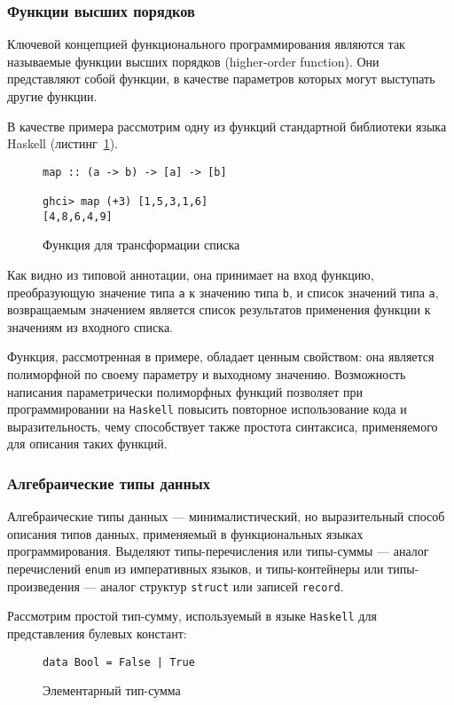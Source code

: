 \subsubsection{Функции высших порядков}
Ключевой концепцией функционального программирования являются так называемые функции высших порядков (higher-order function). Они представляют собой функции, в качестве параметров которых могут выступать другие функции. 

В качестве примера рассмотрим одну из функций стандартной библиотеки языка Haskell (листинг~\ref{listing:map}). 
\begin{figure}[h]
\begin{lstlisting}
map :: (a -> b) -> [a] -> [b]

ghci> map (+3) [1,5,3,1,6]  
[4,8,6,4,9]
\end{lstlisting}
\caption{Функция для трансформации списка}
\label{listing:map}
\end{figure}

Как видно из типовой аннотации, она принимает на вход функцию, преобразующую значение типа \lstinline{a} к значению типа \lstinline{b}, и список значений типа \lstinline{a}, возвращаемым значением является список результатов применения функции к значениям из входного списка.

Функция, рассмотренная в примере, обладает ценным свойством: она является полиморфной по своему параметру и выходному значению. Возможность написания параметрически полиморфных функций позволяет при программировании на \lstinline{Haskell} повысить повторное использование кода и выразительность, чему способствует также простота синтаксиса, применяемого для описания таких функций.     

\subsubsection{Алгебраические типы данных}

Алгебраические типы данных --- минималистический, но выразительный способ описания типов данных, применяемый в функциональных языках программирования. Выделяют типы-перечисления или типы-суммы --- аналог перечислений \lstinline{enum} из императивных языков, и типы-контейнеры или типы-произведения --- аналог структур \lstinline{struct} или записей \lstinline{record}.


Рассмотрим простой тип-сумму, используемый в языке \lstinline{Haskell} для представления булевых констант: 

\begin{figure}[h]
\begin{lstlisting}
data Bool = False | True  
\end{lstlisting}
\caption{Элементарный тип-сумма}
\label{listing:Bool}
\end{figure}

